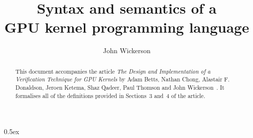 \documentclass[11pt,a4paper]{article}
\begin{document}
\title{Syntax and semantics of a \\ GPU kernel programming language}
\author{John Wickerson}
\maketitle

\begin{abstract}
This document accompanies the article \emph{The Design and 
Implementation of a Verification Technique for GPU Kernels} 
by Adam Betts, Nathan Chong, Alastair F. Donaldson, Jeroen
Ketema, Shaz Qadeer, Paul Thomson and John Wickerson~\cite{gpuverify}. It
formalises all of the definitions provided in Sections~3
and~4 of the article.
\end{abstract}

\tableofcontents

\parindent 0pt\parskip 0.5ex





\end{document}
